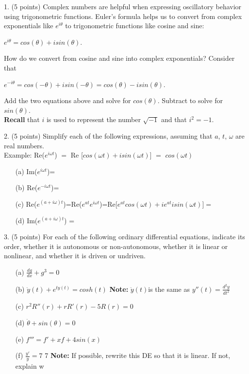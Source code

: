 \documentclass[12pt,letterpaper]{hmcpset}
\begin{document}
\begin{problem}
1. (5 points) Complex numbers are helpful when expressing oscillatory behavior using trigonometric
functions. Euler’s formula helps us to convert from complex exponentials like $e^{i\theta}$ to
trigonometric functions like cosine and sine:
\begin{center}
$e^{i\theta} = cos(\theta) + isin(\theta)$.    
\end{center}
How do we convert from cosine and sine into complex exponentials? Consider that
\begin{center}
$e^{-i\theta} = cos(-\theta) + isin(-\theta)=cos(\theta) - isin(\theta)$.    
\end{center}
Add the two equations above and solve for $cos(\theta)$. Subtract to solve for $sin(\theta)$.\\
\textbf{Recall} that $i$ is used to represent the number $\sqrt{-1}$ and that $i^2 = -1$.
\end{problem}
\newpage

\begin{problem}
2. (5 points) Simplify each of the following expressions, assuming that $a$, $t$, $\omega$ are real numbers.\\
Example:  Re($e^{i\omega t}$) $=$ Re [$cos(\omega t) + isin(\omega t)$] $=$ $cos(\omega t)$

\begin{enumerate}
    \item[(a)] Im($e^{i\omega t}$)= 
    \item[(b)] Re($e^{-i\omega t}$)= 
    \item[(c)] Re($e^{(a+i\omega) t}$)=Re($e^{at}e^{i\omega t}$)=Re[$e^{at}cos(\omega t) + ie^{at}isin(\omega t)$]$=$ 
    \item[(d)] Im($e^{(a+i\omega) t}$) =
\end{enumerate}

\end{problem}
\newpage

\begin{problem}
3. (5 points) For each of the following ordinary differential equations, indicate its order, whether
it is autonomous or non-autonomous, whether it is linear or nonlinear, and whether it is
driven or undriven.\\

\begin{enumerate}
    \item[(a)] $ \frac{dg}{dx}+g^3=0$
    \item[(b)] $\ddot{y}(t)+e^{ty(t)}=cosh(t)$ \textbf{Note:} $\ddot{y}(t)$is the same as $y''(t)= \frac{d^2 y}{dt^2}$ 
    \item[(c)] $r^2R''(r) + rR'(r)-5R(r) =0$
    \item[(d)] $\ddot{\theta}+sin(\theta)=0$
    \item[(e)] $f'''=f'+xf+4sin(x)$
    \item[(f)] $\frac{y'}{y}=7$ 7 \textbf{Note:} If possible, rewrite this DE so that it is linear. If not, explain w
\end{enumerate}

\end{problem}
\newpage
\end{document}
